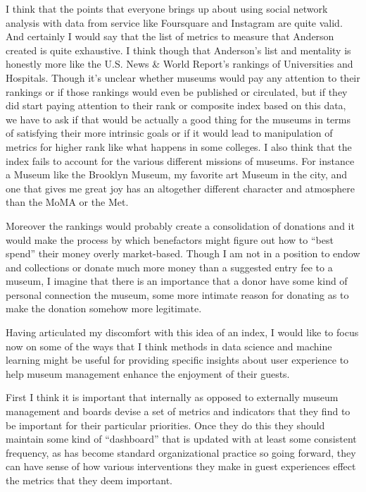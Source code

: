 \documentclass{article}
\begin{document}
I think that the points that everyone brings up about using social network analysis with data from service like Foursquare and Instagram are quite valid.  And certainly I would say that the list of metrics to measure that Anderson created is quite exhaustive.  I think though that Anderson’s list and mentality is honestly more like the U.S. News \& World Report's rankings of Universities and Hospitals.  Though it’s unclear whether museums would pay any attention to their rankings or if those rankings would even be published or circulated, but if they did start paying attention to their rank or composite index based on this data, we have to ask if that would be actually a good thing for the museums in terms of satisfying their more intrinsic goals or if it would lead to manipulation of metrics for higher rank like what happens in some colleges.  I also think that the index fails to account for the various different missions of museums.  For instance a Museum like the Brooklyn Museum, my favorite art Museum in the city, and one that gives me great joy has an altogether different character and atmosphere than the MoMA or the Met.  

Moreover the rankings would probably create a consolidation of donations and it would make the process by which benefactors might figure out how to “best spend” their money overly market-based.  Though I am not in a position to endow and collections or donate much more money than a suggested entry fee to a museum, I imagine that there is an importance that a donor have some kind of personal connection the museum, some more intimate reason for donating as to make the donation somehow more legitimate.  

Having articulated my discomfort with this idea of an index, I would like to focus now on some of the ways that I think methods in data science and machine learning might be useful for providing specific insights about user experience to help museum management enhance the enjoyment of their guests.  

First I think it is important that internally as opposed to externally museum management and boards devise a set of metrics and indicators that they find to be important for their particular priorities.  Once they do this they should maintain some kind of “dashboard” that is updated with at least some consistent frequency, as has become standard organizational practice so going forward, they can have sense of how various interventions they make in guest experiences effect the metrics that they deem important.
\end{document}
